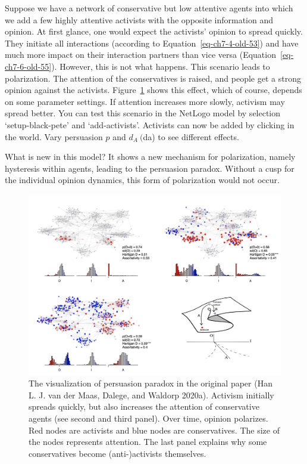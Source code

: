 \documentclass[
  a4paper,
  DIV=11,
  numbers=noendperiod]{scrreprt}
\begin{document}
Suppose we have a network of conservative but low attentive agents into
which we add a few highly attentive activists with the opposite
information and opinion. At first glance, one would expect the
activists' opinion to spread quickly. They initiate all interactions
(according to Equation~\ref{eq-ch7-4-old-53}) and have much more impact
on their interaction partners than vice versa
(Equation~\ref{eq-ch7-6-old-55}). However, this is not what happens.
This scenario leads to polarization. The attention of the conservatives
is raised, and people get a strong opinion against the activists.
Figure~\ref{fig-ch7-img11-old-99} shows this effect, which of course,
depends on some parameter settings. If attention increases more slowly,
activism may spread better. You can test this scenario in the NetLogo
model by selection `setup-black-pete' and `add-activists'. Activists can
now be added by clicking in the world. Vary persuasion \(p\) and
\(d_{A}\ (\)da) to see different effects.

What is new in this model? It shows a new mechanism for polarization,
namely hysteresis within agents, leading to the persuasion paradox.
Without a cusp for the individual opinion dynamics, this form of
polarization would not occur.

\begin{figure}

{\centering \includegraphics{media/ch7/image11.jpg}

}

\caption{\label{fig-ch7-img11-old-99}The visualization of persuasion
paradox in the original paper (Han L. J. van der Maas, Dalege, and
Waldorp 2020a). Activism initially spreads quickly, but also increases
the attention of conservative agents (see second and third panel). Over
time, opinion polarizes. Red nodes are activists and blue nodes are
conservatives. The size of the nodes represents attention. The last
panel explains why some conservatives become (anti-)activists
themselves.}

\end{figure}
\end{document}
